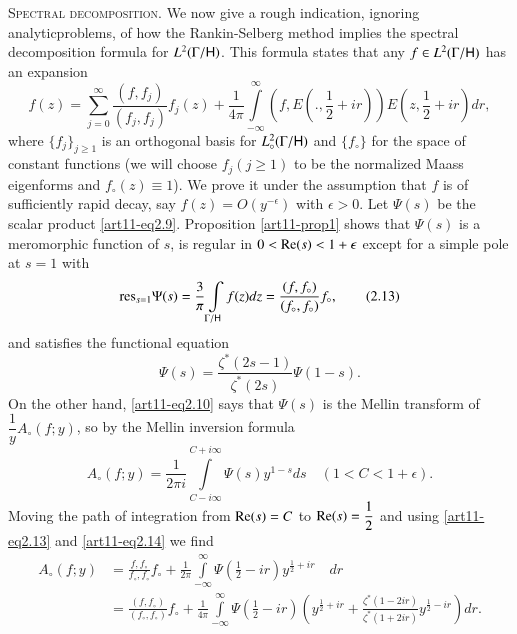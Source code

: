 \medskip
\noindent
\textsc{Spectral decomposition.} We now give a rough indication, ignoring analytic\pageoriginale problems, of how the Rankin-Selberg method implies the spectral decomposition formula for $L^2 (\Gamma / \mathsf{H})$. This formula states that any $f \in L^2 (\Gamma / \mathsf{H})$ has an expansion
\begin{equation*}
f(z) = \sum\limits^\infty_{j=0} \frac{(f, f_j)}{(f_j, f_j)} f_j(z) + \frac{1}{4\pi} \int\limits^\infty_{-\infty} (f, E (., \frac{1}{2} + ir)) E (z, \frac{1}{2} + ir) dr, \tag{2.12} \label{art11-eq2.12}
\end{equation*}
where $\{f_j\}_{j \geq 1}$ is an orthogonal basis for $L^2_\circ (\Gamma / \mathsf{H})$ and $\{f_\circ\}$ for the space of constant functions (we will choose $f_j(j \geq 1)$ to be the normalized Maass eigenforms and $f_\circ (z) \equiv 1$). We prove it under the assumption that $f$ is of sufficiently rapid decay, say $f(z) = O(y^{-\epsilon})$ with $\epsilon >0$. Let $\Psi (s)$  be the scalar product \eqref{art11-eq2.9}. Proposition \ref{art11-prop1} shows that $\Psi (s)$ is a meromorphic function of $s$, is regular in $0  < \operatorname{Re} (s) <1 +\epsilon$ except  for a simple pole at $s =1$ with 
\begin{equation*}
\mathrm{res}_{s=1} \Psi (s) = \frac{3}{\pi} \int\limits_{\Gamma / \mathsf{H}} f(z) dz = \frac{(f, f_\circ)}{(f_\circ, f_\circ)}  f_\circ,
\tag{2.13}\label{art11-eq2.13}
\end{equation*}
and satisfies the functional equation 
\begin{equation*}
\Psi (s) = \frac{\zeta^\ast (2s -1)}{\zeta^\ast(2s)} \Psi (1-s). \tag{2.14}\label{art11-eq2.14}
\end{equation*}
On the other hand, \eqref{art11-eq2.10} says that $\Psi (s)$ is the Mellin transform of $\dfrac{1}{y}A_\circ (f;y)$, so by the Mellin inversion formula
$$
A_\circ (f;y) = \frac{1}{2 \pi i} \int\limits^{C + i \infty}_{C - i \infty} \Psi (s) y^{1-s} ds \quad  (1< C < 1+ \epsilon) .
$$
Moving the path of integration from $\operatorname{Re} (s) = C$ to $\operatorname{Re} (s) = \dfrac{1}{2}$ and using \eqref{art11-eq2.13} and \eqref{art11-eq2.14} we find 
\begin{align*}
A_\circ (f;y) & = \frac{f, f_\circ}{f_\circ, f_\circ} f_\circ + \frac{1}{2\pi} \int\limits^\infty_{-\infty} \Psi (\frac{1}{2} - ir) y^{\frac{1}{2}  + ir} \quad dr\\
& = \frac{(f, f_\circ)}{(f_\circ, f_\circ)}  f_\circ + \frac{1}{4\pi} \int\limits^\infty_{-\infty}  \Psi (\frac{1}{2} - ir) (y^{\frac{1}{2} + ir} + \frac{\zeta^\ast (1-2ir)}{\zeta^\ast (1+ 2 ir)} y^{\frac{1}{2} - ir}) dr. \tag{2.15}\label{art11-eq2.15}
\end{align*}
